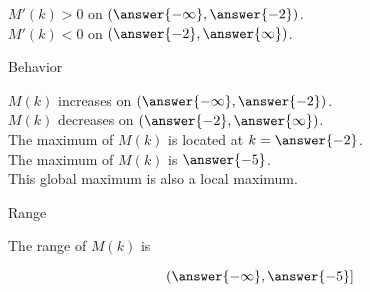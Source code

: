 \documentclass{ximera}
\begin{document}
\begin{exercise}
\begin{question}
$M'(k) > 0$ on $\left( \answer{-\infty}, \answer{-2} \right)$. \\


$M'(k) < 0$ on $\left( \answer{-2}, \answer{\infty} \right)$. \\

\end{question}





\begin{question} Behavior



$M(k)$ increases on $\left( \answer{-\infty}, \answer{-2} \right)$. \\


$M(k)$ decreases on $\left( \answer{-2}, \answer{\infty} \right)$. \\


The maximum of $M(k)$ is located at  $k = \answer{-2}$. \\


The maximum of $M(k)$ is $\answer{-5}$. \\


This global maximum is also a local maximum.

\end{question}










\begin{question} Range



The range of $M(k)$ is 

\[
\left( \answer{-\infty}, \answer{-5} \right]
\]



\end{question}









\end{exercise}
\end{document}
